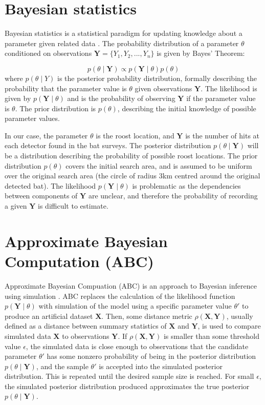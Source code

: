 
\section{Bayesian statistics}

Bayesian statistics is a statistical paradigm for updating knowledge about a
parameter given related data \cite{Gelman2013}. The probability distribution of a parameter
$\theta$ conditioned on observations $\bm{Y} = \{ Y_1, Y_2, ..., Y_n \}$ is
given by Bayes' Theorem:

\begin{equation}
  p(\theta \mid \bm{Y}) \propto p(\bm{Y} \mid \theta) p(\theta)
  \nonumber
\end{equation}
%
where $p(\theta \mid Y)$ is the posterior probability distribution, formally
describing the probability that the parameter value is $\theta$ given
observations $\bm{Y}$. The likelihood is given by $p(\bm{Y} \mid \theta)$ and
is the probability of observing $\bm{Y}$ if the parameter value is $\theta$. The
prior distribution is $p(\theta)$, describing the initial knowledge of possible
parameter values.

In our case, the parameter $\theta$ is the roost location, and $\bm{Y}$ is the
number of hits at each detector found in the bat surveys. The posterior
distribution $ p(\theta \mid \bm{Y})$ will be a distribution describing the
probability of possible roost locations. The prior distribution $p(\theta)$
covers the initial search area, and is assumed to be uniform over the original
search area (the circle of radius 3km centred around the original detected bat).
The likelihood $p(\bm{Y} \mid \theta)$ is problematic as the dependencies
between components of $\bm{Y}$ are unclear, and therefore the probability of
recording a given $\bm{Y}$ is difficult to estimate.

\section{Approximate Bayesian Computation (ABC)}
\label{section:ABC}

Approximate Bayesian Compuation (ABC) is an approach to Bayesian inference using
simulation \cite{Beaumont2002, Sisson2010}. ABC replaces the calculation
of the likelihood function $p(\bm{Y} \mid \theta)$ with simulation of the model
using a specific parameter value $\theta'$ to produce an artificial dataset
$\bm{X}$. Then, some distance metric $\rho (\bm{X}, \bm{Y}) $, usually defined
as a distance between summary statistics of $\bm{X}$ and $\bm{Y}$, is used to
compare simulated data $\bm{X}$ to observations $\bm{Y}$. If $\rho (\bm{X},
\bm{Y}) $ is smaller than some threshold value $\epsilon$, the simulated data is
close enough to observations that the candidate parameter $\theta'$ has some
nonzero probability of being in the posterior distribution $ p(\theta \mid
\bm{Y})$, and the sample $\theta'$ is accepted into the simulated posterior
distribution. This is repeated until the desired sample size is reached. For
small $\epsilon$, the simulated posterior distribution produced approximates the
true posterior $ p(\theta \mid \bm{Y})$.

